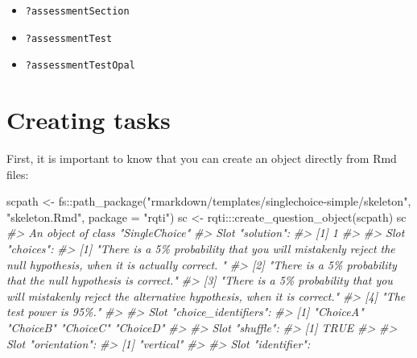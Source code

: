 \documentclass[twoside]{tufte-book}
\newenvironment{Shaded}{}{}
\newcommand{\AttributeTok}[1]{\textcolor[rgb]{0.49,0.56,0.16}{#1}}
\newcommand{\CommentTok}[1]{\textcolor[rgb]{0.38,0.63,0.69}{\textit{#1}}}
\newcommand{\FunctionTok}[1]{\textcolor[rgb]{0.02,0.16,0.49}{#1}}
\newcommand{\NormalTok}[1]{#1}
\newcommand{\OtherTok}[1]{\textcolor[rgb]{0.00,0.44,0.13}{#1}}
\newcommand{\SpecialCharTok}[1]{\textcolor[rgb]{0.25,0.44,0.63}{#1}}
\newcommand{\StringTok}[1]{\textcolor[rgb]{0.25,0.44,0.63}{#1}}
\providecommand{\tightlist}{%
  \setlength{\itemsep}{0pt}\setlength{\parskip}{0pt}}
\begin{document}
\begin{itemize}
\tightlist
\item
  \texttt{?assessmentSection}
\item
  \texttt{?assessmentTest}
\item
  \texttt{?assessmentTestOpal}
\end{itemize}

\section{Creating tasks}\label{creating-tasks}

First, it is important to know that you can create an object directly from Rmd files:

\begin{Shaded}
\begin{Highlighting}[]
\NormalTok{scpath }\OtherTok{\textless{}{-}}\NormalTok{ fs}\SpecialCharTok{::}\FunctionTok{path\_package}\NormalTok{(}\StringTok{"rmarkdown/templates/singlechoice{-}simple/skeleton"}\NormalTok{, }
                           \StringTok{"skeleton.Rmd"}\NormalTok{, }\AttributeTok{package =} \StringTok{"rqti"}\NormalTok{)}
\NormalTok{sc }\OtherTok{\textless{}{-}}\NormalTok{ rqti}\SpecialCharTok{:::}\FunctionTok{create\_question\_object}\NormalTok{(scpath)}
\NormalTok{sc}
\CommentTok{\#\textgreater{} An object of class "SingleChoice"}
\CommentTok{\#\textgreater{} Slot "solution":}
\CommentTok{\#\textgreater{} [1] 1}
\CommentTok{\#\textgreater{} }
\CommentTok{\#\textgreater{} Slot "choices":}
\CommentTok{\#\textgreater{} [1] "There is a 5\% probability that you will mistakenly reject the null hypothesis, when it is actually correct. "}
\CommentTok{\#\textgreater{} [2] "There is a 5\% probability that the null hypothesis is correct."                                              }
\CommentTok{\#\textgreater{} [3] "There is a 5\% probability that you will mistakenly reject the alternative hypothesis, when it is correct."   }
\CommentTok{\#\textgreater{} [4] "The test power is 95\%."                                                                                      }
\CommentTok{\#\textgreater{} }
\CommentTok{\#\textgreater{} Slot "choice\_identifiers":}
\CommentTok{\#\textgreater{} [1] "ChoiceA" "ChoiceB" "ChoiceC" "ChoiceD"}
\CommentTok{\#\textgreater{} }
\CommentTok{\#\textgreater{} Slot "shuffle":}
\CommentTok{\#\textgreater{} [1] TRUE}
\CommentTok{\#\textgreater{} }
\CommentTok{\#\textgreater{} Slot "orientation":}
\CommentTok{\#\textgreater{} [1] "vertical"}
\CommentTok{\#\textgreater{} }
\CommentTok{\#\textgreater{} Slot "identifier":}

\end{Highlighting}
\end{Shaded}
\end{document}

